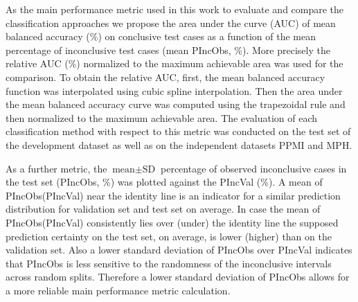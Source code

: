 
As the main performance metric used in this work to evaluate and compare the classification approaches 
we propose the area under the curve (AUC) of mean balanced accuracy (\%) on conclusive test cases as a function of 
the mean percentage of inconclusive test cases (mean PIncObs, \%).
More precisely the relative AUC (\%) normalized to the maximum achievable area was used for the comparison.
To obtain the relative AUC, 
first, the mean balanced accuracy function was interpolated using cubic spline interpolation.
Then the area under the mean balanced accuracy curve was computed using the trapezoidal rule 
and then normalized to the maximum achievable area.
The evaluation of each classification method with respect to this metric was conducted on the test set of the 
development dataset as well as on the independent datasets PPMI and MPH.

As a further metric, the $\text{mean} \pm \text{SD}$ percentage of observed inconclusive cases in the test set (PIncObs, \%) 
was plotted against the PIncVal (\%).
A mean of PIncObs(PIncVal) near the identity line is an indicator for a similar prediction distribution 
for validation set and test set on average.
In case the mean of PIncObs(PIncVal) consistently lies over (under) the identity line 
the supposed prediction certainty on the test set, on average, is lower (higher) than on the validation set.
Also a lower standard deviation of PIncObs over PIncVal indicates 
that PIncObs is less sensitive to the randomness of the inconclusive intervals across random splits.
Therefore a lower standard deviation of PIncObs allows for a more reliable main performance metric calculation.
